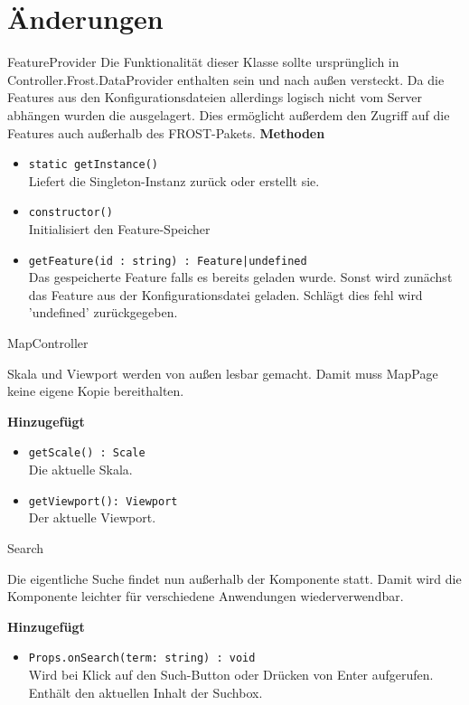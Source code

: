 \section{Änderungen}
\begin{Change}{FeatureProvider}
    Die Funktionalität dieser Klasse sollte ursprünglich in 
    Controller.Frost.DataProvider enthalten sein und nach außen versteckt. 
    Da die Features aus den Konfigurationsdateien allerdings logisch nicht 
    vom Server abhängen wurden die ausgelagert. Dies ermöglicht außerdem den 
    Zugriff auf die Features auch außerhalb des FROST-Pakets.
    \textbf{Methoden}
    \begin{itemize}
        \item \texttt{static getInstance()}
        \\ Liefert die Singleton-Instanz zurück oder erstellt sie.
        \item \texttt{constructor()}
        \\ Initialisiert den Feature-Speicher
        \item \texttt{getFeature(id : string) : Feature|undefined}
        \\ Das gespeicherte Feature falls es bereits geladen wurde.
        Sonst wird zunächst das Feature aus der Konfigurationsdatei geladen.
        Schlägt dies fehl wird 'undefined' zurückgegeben.
    \end{itemize}
\end{Change}

\begin{Change}{MapController}
    
    Skala und Viewport werden von außen lesbar gemacht.
    Damit muss MapPage keine eigene Kopie bereithalten.

    \textbf{Hinzugefügt}
    \begin{itemize}
        \item \texttt{getScale() : Scale}
        \\ Die aktuelle Skala.
        \item \texttt{getViewport(): Viewport}
        \\ Der aktuelle Viewport.
    \end{itemize}

\end{Change}

\begin{Change}{Search}
    
    Die eigentliche Suche findet nun außerhalb der Komponente statt.
    Damit wird die Komponente leichter für verschiedene Anwendungen wiederverwendbar.

    \textbf{Hinzugefügt}
    \begin{itemize}
        \item \texttt{Props.onSearch(term: string) : void}
        \\ Wird bei Klick auf den Such-Button oder Drücken von Enter aufgerufen.
        Enthält den aktuellen Inhalt der Suchbox. 
    \end{itemize}

\end{Change}


